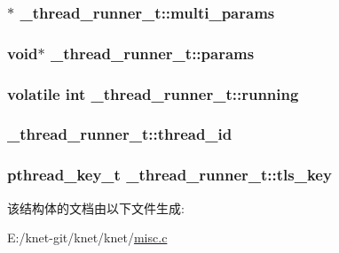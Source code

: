 \subsubsection[{multi\+\_\+params}]{$\ast$ \+\_\+thread\+\_\+runner\+\_\+t\+::multi\+\_\+params}\label{a00036_ac7256131136cb877833040554a384e6d_ac7256131136cb877833040554a384e6d}
\hypertarget{a00036_aab08f4e0fa5f6ffe16fcd3c055666c9c_aab08f4e0fa5f6ffe16fcd3c055666c9c}{}
\subsubsection[{params}]{\setlength{\rightskip}{0pt plus 5cm}void$\ast$ \+\_\+thread\+\_\+runner\+\_\+t\+::params}\label{a00036_aab08f4e0fa5f6ffe16fcd3c055666c9c_aab08f4e0fa5f6ffe16fcd3c055666c9c}
\hypertarget{a00036_a158d37a73657b2df73e3a2dd383808f8_a158d37a73657b2df73e3a2dd383808f8}{}
\subsubsection[{running}]{\setlength{\rightskip}{0pt plus 5cm}volatile int \+\_\+thread\+\_\+runner\+\_\+t\+::running}\label{a00036_a158d37a73657b2df73e3a2dd383808f8_a158d37a73657b2df73e3a2dd383808f8}
\hypertarget{a00036_ab632944b59861e33a9473347b0afdc00_ab632944b59861e33a9473347b0afdc00}{}
\subsubsection[{thread\+\_\+id}]{ \+\_\+thread\+\_\+runner\+\_\+t\+::thread\+\_\+id}\label{a00036_ab632944b59861e33a9473347b0afdc00_ab632944b59861e33a9473347b0afdc00}
\hypertarget{a00036_ad7461a4eef9b83e07f0acd4f26923744_ad7461a4eef9b83e07f0acd4f26923744}{}
\subsubsection[{tls\+\_\+key}]{\setlength{\rightskip}{0pt plus 5cm}pthread\+\_\+key\+\_\+t \+\_\+thread\+\_\+runner\+\_\+t\+::tls\+\_\+key}\label{a00036_ad7461a4eef9b83e07f0acd4f26923744_ad7461a4eef9b83e07f0acd4f26923744}


该结构体的文档由以下文件生成\+:\begin{DoxyCompactItemize}
\item 
E\+:/knet-\/git/knet/knet/\hyperlink{a00082}{misc.\+c}\end{DoxyCompactItemize}
